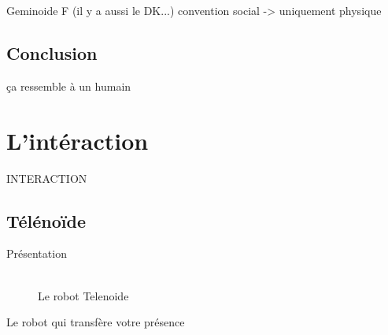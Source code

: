 \documentclass{beamer}
\begin{document}
\begin{frame}{Geminoide F}
  (il y a aussi le DK...)
  convention social -> uniquement physique
\end{frame}

\subsection{Conclusion}
\begin{frame}{ça ressemble à un humain}
\end{frame}

\section{L'intéraction}
\begin{frame}
  INTERACTION
\end{frame}

\subsection{Télénoïde}
\begin{frame}{Présentation}
  \begin{framed}
	\begin{figure}
		\centering
		\includegraphics[width=0.05]{data/telenoid}
		\caption{Le robot Telenoide}
    \end{figure}
  \end{framed}  
  Le robot qui transfère votre présence
\end{frame}
\end{document}
